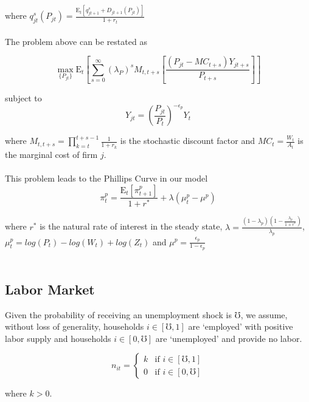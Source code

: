 \documentclass[titlepage]{\econtex}\providecommand{\texname}{FBS-NK}
\begin{document}
where  $q^{s}_{jt}\left(P_{jt}\right) = \frac{\mathrm{E}_{t}\left[q^{s}_{jt+1} +D_{jt+1}\left(P_{jt}\right)\right]}{1+r_{t}}$ \\ \\

The problem above can be restated as 
 
 $$\max_{\{P_{jt}\}} \mathrm{E}_{t}\left[\sum_{s=0}^{\infty} (\lambda_{P}) ^{s} M_{t,t+s} \left[ \frac{(P_{jt} - MC_{t+s})Y_{jt+s}}{P_{t+s}}\right]\right]$$
 
subject to $$Y_{jt} = \left(\frac {P_{jt}}{P_{t}}\right)^{- \epsilon_{p}} Y_{t}$$
 
where $M_{t, t+s} = \prod_{k=t}^{t+s-1} \frac{1}{1+r_{k}}$ is the stochastic discount factor and $MC_{t} = \frac{W_{t}}{A_{t}}$ is the marginal cost of firm $j$.  \\ \\


This problem leads to the Phillips Curve in our model \\ 

\begin{equation} \pi_{t}^{p} = \frac{\mathrm{E}_{t}[\pi_{t+1}^{p}]}{1+r^{*}} + \lambda (\mu_{t}^{p} -\mu^{p}) \end{equation}

where $r^{*}$ is the natural rate of interest in the steady state, $\lambda = \frac{(1-\lambda_{p})(1-\frac{\lambda_{p}}{1+r^{*}})}{\lambda_{p}}$,  $ \mu_{t}^{p} = log(P_{t}) - log(W_{t}) + log(Z_{t})$ and $\mu^{p} = \frac{\epsilon_{p}}{1-\epsilon_{p}}$ \\ \\



\hypertarget{Labor Market}{}
\subsection{Labor Market}

Given the probability of receiving an unemployment shock is $\mho$, we assume, without loss of generality, households $i \in [\mho,1]$ are `employed'  with positive labor supply and households $i \in [0, \mho]$  are `unemployed' and provide no labor. 

$$
n _{it}=
\begin{cases}
 k  & \text{if  $i \in [\mho, 1]$} \\
 0      & \text{if  $i \in [0, \mho]$} 
\end{cases} 
$$

where $k>0$. \\
\end{document}
